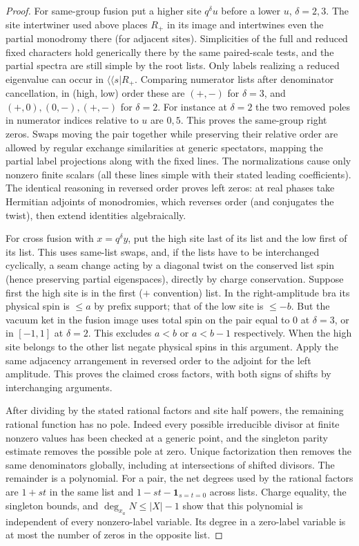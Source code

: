 \begin{proof}
For same-group fusion put a higher site $q^\delta u$ before a lower $u$, $\delta=2,3$. The site intertwiner used above places $R_+$ in its image and intertwines even the partial monodromy there (for adjacent sites). Simplicities of the full and reduced fixed characters hold generically there by the same paired-scale tests, and the partial spectra are still simple by the root lists. Only labels realizing a reduced eigenvalue can occur in $\langle\langle s|R_+$. Comparing numerator lists after denominator cancellation, in (high, low) order these are $(+,-)$ for $\delta=3$, and $(+,0),(0,-),(+,-)$ for $\delta=2$. For instance at $\delta=2$ the two removed poles in numerator indices relative to $u$ are $0,5$. This proves the same-group right zeros. Swaps moving the pair together while preserving their relative order are allowed by regular exchange similarities at generic spectators, mapping the partial label projections along with the fixed lines. The normalizations cause only nonzero finite scalars (all these lines simple with their stated leading coefficients). The identical reasoning in reversed order proves left zeros: at real phases take Hermitian adjoints of monodromies, which reverses order (and conjugates the twist), then extend identities algebraically.

For cross fusion with $x=q^\delta y$, put the high site last of its list and the low first of its list. This uses same-list swaps, and, if the lists have to be interchanged cyclically, a seam change acting by a diagonal twist on the conserved list spin (hence preserving partial eigenspaces), directly by charge conservation. Suppose first the high site is in the first ($+$ convention) list. In the right-amplitude bra its physical spin is $\le a$ by prefix support; that of the low site is $\le-b$. But the vacuum ket in the fusion image uses total spin on the pair equal to 0 at $\delta=3$, or in $[-1,1]$ at $\delta=2$. This excludes $a<b$ or $a<b-1$ respectively. When the high site belongs to the other list negate physical spins in this argument. Apply the same adjacency arrangement in reversed order to the adjoint for the left amplitude. This proves the claimed cross factors, with both signs of shifts by interchanging arguments.

After dividing by the stated rational factors and site half powers,
the remaining rational function has no pole. Indeed every possible
irreducible divisor at finite nonzero values has been checked at a
generic point, and the singleton parity estimate removes the
possible pole at zero. Unique factorization then removes the same
denominators globally, including at intersections of shifted
divisors. The remainder is a polynomial. For a pair, the net degrees
used by the rational factors are $1+st$ in the same list and
$1-st-\mathbf1_{s=t=0}$ across lists. Charge equality, the
singleton bounds, and $\deg_{x_a}N\le |X|-1$ show that this
polynomial is independent of every nonzero-label variable. Its
degree in a zero-label variable is at most the number of zeros in
the opposite list.


\end{proof}
